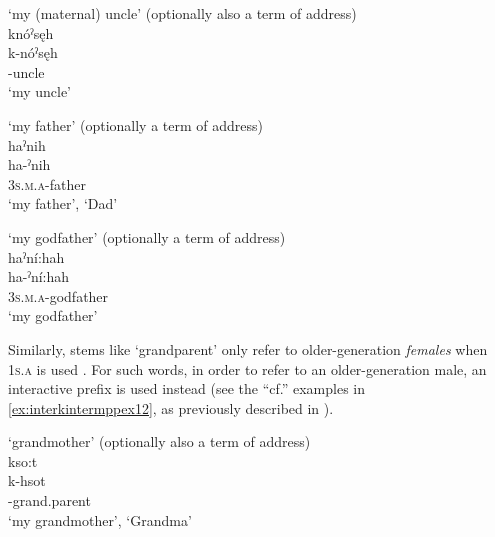 \ea\label{ex:interkintermppex20}  ‘my (maternal) uncle’ (optionally also a term of address)\\
knóˀsęh\\
\gll k-nóˀsęh\\
 -uncle\\
\glt `my uncle'
\z


\ea\label{ex:interkintermppex22}  ‘my father’ (optionally a term of address)\\
haˀnih \\
\gll ha-ˀnih\\
 \textsc{3s.m.a}-father\\
\glt ‘my father’, `Dad'
\z


\ea\label{ex:interkintermppex26}  ‘my godfather’ (optionally a term of address)\\
haˀní:hah\\
\gll ha-ˀní:hah\\
 \textsc{3s.m.a}-godfather\\
\glt `my godfather'
\z


Similarly, stems like  ‘grandparent’ only refer to older-generation \textit{females} when  \textsc{1s.a} is used . For such words, in order to refer to an older-generation male, an interactive prefix is used instead (see the “cf.” examples in \ref{ex:interkintermppex12}, as previously described in ).

\ea\label{ex:interkintermppex12}  ‘grandmother’ (optionally also a term of address)\\
 kso:t \\
\gll k-hsot \\
-grand.parent \\
\glt ‘my grandmother’, ‘Grandma’ 
\z

